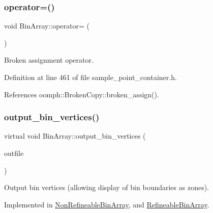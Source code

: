 \mbox{\label{classBinArray_ae460c4ee2dd1e1f020a74fd9ec9b6a5e}} 
\subsubsection{\texorpdfstring{operator=()}{operator=()}}
{\footnotesize\ttfamily void Bin\+Array\+::operator= (\begin{DoxyParamCaption}\item[{const \hyperlink{classBinArray}{Bin\+Array} \&}]{ }\end{DoxyParamCaption})\hspace{0.3cm}{\ttfamily [inline]}}



Broken assignment operator. 



Definition at line 461 of file sample\+\_\+point\+\_\+container.\+h.



References oomph\+::\+Broken\+Copy\+::broken\+\_\+assign().

\mbox{\label{classBinArray_afc595a05f2ab19e1bb973c5a076b1432}} 
\subsubsection{\texorpdfstring{output\+\_\+bin\+\_\+vertices()}{output\_bin\_vertices()}}
{\footnotesize\ttfamily virtual void Bin\+Array\+::output\+\_\+bin\+\_\+vertices (\begin{DoxyParamCaption}\item[{std\+::ofstream \&}]{outfile }\end{DoxyParamCaption})\hspace{0.3cm}{\ttfamily [pure virtual]}}



Output bin vertices (allowing display of bin boundaries as zones). 



Implemented in \hyperlink{classNonRefineableBinArray_a9db5392fc81650a23251f1f5de52f0af}{Non\+Refineable\+Bin\+Array}, and \hyperlink{classRefineableBinArray_a982851086eb3973d4f17d5a5364d8faa}{Refineable\+Bin\+Array}.

